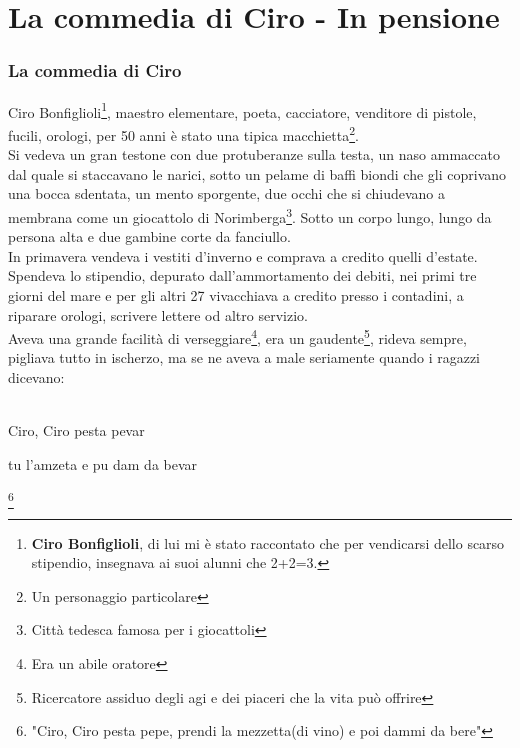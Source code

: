 
\chapter{La commedia di Ciro - In pensione}
\subsection{La commedia di Ciro}
Ciro Bonfiglioli\footnote{\textbf{Ciro Bonfiglioli}, di lui mi è stato raccontato che per vendicarsi dello scarso stipendio, insegnava ai suoi alunni che 2+2=3.}, maestro elementare, poeta, cacciatore, venditore di pistole, fucili, orologi, per 50 anni è stato una tipica macchietta\footnote{Un personaggio particolare}.\\
\indent Si vedeva un gran testone con due protuberanze sulla testa, un naso ammaccato dal quale si staccavano le narici, sotto un pelame di baffi biondi che gli coprivano una bocca sdentata, un mento sporgente, due occhi che si chiudevano a membrana come un giocattolo di Norimberga\footnote{Città tedesca famosa per i giocattoli}. Sotto un corpo lungo, lungo da persona alta e due gambine corte da fanciullo.\\
\indent In primavera vendeva i vestiti d'inverno e comprava a credito quelli d'estate. Spendeva lo stipendio, depurato dall'ammortamento dei debiti, nei primi tre giorni del mare e per gli altri 27 vivacchiava a credito presso i contadini, a riparare orologi, scrivere lettere od altro servizio. \\

\indent Aveva una grande facilità di verseggiare\footnote{Era un abile oratore}, era un gaudente\footnote{Ricercatore assiduo degli agi e dei piaceri che la vita può offrire}, rideva sempre, pigliava tutto in ischerzo, ma se ne aveva a male seriamente quando i ragazzi dicevano: \\\\
\textcal \Huge
	\centerline{Ciro, Ciro pesta pevar}
	\centerline{tu l'amzeta e pu dam da bevar}\normalfont \normalsize\footnote{"Ciro, Ciro pesta pepe, prendi la mezzetta(di vino) e poi dammi da bere"}

